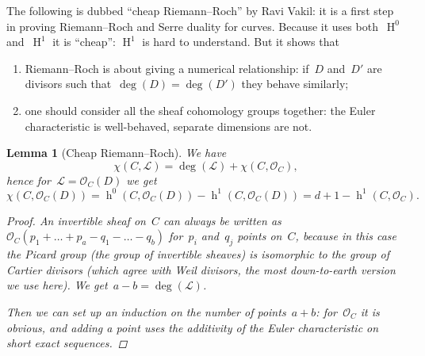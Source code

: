 \documentclass[10pt,a4paper]{article}
\theoremstyle{lecture}
\newtheorem{lemma}[theorem]{Lemma}
\DeclareMathOperator\hh{h}
\DeclareMathOperator\HH{H}
\begin{document}
The following is dubbed ``cheap Riemann--Roch'' by Ravi Vakil: it is a first step in proving Riemann--Roch and Serre duality for curves. Because it uses both~$\HH^0$ and~$\HH^1$ it is ``cheap'': $\HH^1$ is hard to understand. But it shows that
\begin{enumerate}
  \item Riemann--Roch is about giving a numerical relationship: if~$D$ and~$D'$ are divisors such that~$\deg(D)=\deg(D')$ they behave similarly;
  \item one should consider all the sheaf cohomology groups together: the Euler characteristic is well-behaved, separate dimensions are not.
\end{enumerate}
\begin{lemma}[Cheap Riemann--Roch]
  \label{lemma:cheap-riemann-roch}
  We have
  \begin{equation}
    \chi(C,\mathcal{L})=\deg(\mathcal{L})+\chi(C,\mathcal{O}_C),
  \end{equation}
  hence for~$\mathcal{L}=\mathcal{O}_C(D)$ we get
  \begin{equation}
    \chi(C,\mathcal{O}_C(D))=\hh^0(C,\mathcal{O}_C(D))-\hh^1(C,\mathcal{O}_C(D))=d+1-\hh^1(C,\mathcal{O}_C).
  \end{equation}

  \begin{proof}
    An invertible sheaf on~$C$ can always be written as~$\mathcal{O}_C(p_1+\dotso+p_a-q_1-\dotso-q_b)$ for~$p_i$ and~$q_j$ points on~$C$, because in this case the Picard group (the group of invertible sheaves) is isomorphic to the group of Cartier divisors (which agree with Weil divisors, the most down-to-earth version we use here). We get~$a-b=\deg(\mathcal{L})$.
    
    Then we can set up an induction on the number of points~$a+b$: for~$\mathcal{O}_C$ it is obvious, and adding a point uses the additivity of the Euler characteristic on short exact sequences.
  \end{proof}
\end{lemma}
\end{document}
